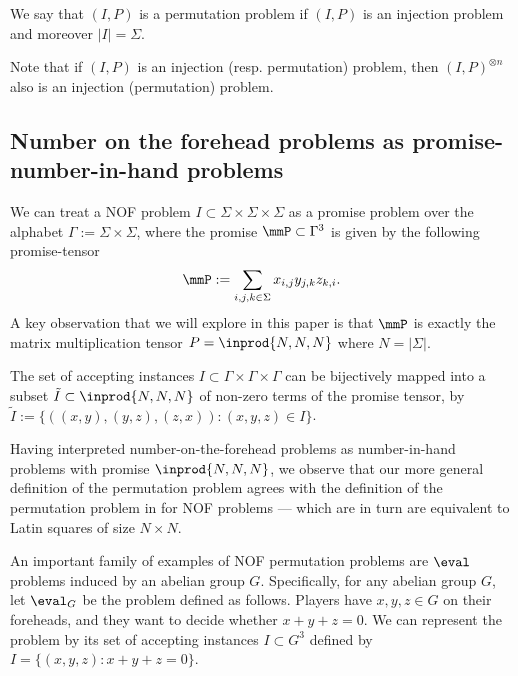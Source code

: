 \begin{definition}
    We say that $(I, P)$ is a permutation problem if $(I, P)$ is an injection problem and moreover $|I| = \Sigma$.
\end{definition}

Note that if $(I, P)$ is an injection (resp. permutation) problem, then $(I, P)^{\otimes n}$ also is an injection (permutation) problem.

\subsection{Number on the forehead problems as promise-number-in-hand problems}
We can treat a NOF problem $I \subset \Sigma \times \Sigma \times \Sigma$ as a promise problem over the alphabet $\Gamma := \Sigma \times \Sigma$, where the promise $\mmP \subset \Gamma^3$ is given by the following promise-tensor
\begin{equation*}
    \mmP := \sum_{i,j,k \in \Sigma} x_{i,j} y_{j,k} z_{k,i}.
\end{equation*}
A key observation that we will explore in this paper is that $\mmP$ is exactly the matrix multiplication tensor $P = \inprod{N,N,N}$ where $N = |\Sigma|$.

The set of accepting instances $I \subset \Gamma \times \Gamma \times \Gamma$ can be bijectively mapped into a subset $\tilde{I} \subset \inprod{N,N,N}$ of non-zero terms of the promise tensor, by $\tilde{I} := \{ ((x,y), (y,z), (z,x) ) : (x,y,z) \in I \}$.

Having interpreted number-on-the-forehead problems as number-in-hand problems with promise $\inprod{N,N,N}$, we observe that our more general definition of the permutation problem agrees with the definition of the permutation problem in \cite{LPS17} for NOF problems --- which are in turn are equivalent to Latin squares of size $N \times N$.

An important family of examples of NOF permutation problems are $\eval$ problems induced by an abelian group $G$. Specifically, for any abelian group $G$, let $\eval_G$ be the problem defined as follows. Players have $x,y,z \in G$ on their foreheads, and they want to decide whether $x+y+z = 0$. We can represent the problem by its set of accepting instances $I \subset G^3$ defined by $I = \{(x,y,z) : x+y+z = 0\}$. %


